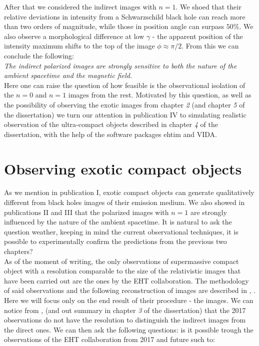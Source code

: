 \documentclass[12pt]{article}
\numberwithin{equation}{section}
\numberwithin{figure}{section}
\begin{document}
	After that we considered the indirect images with $n = 1$. We shoed that their relative deviations in intensity from a Schwarzschild black hole can reach more than two orders of magnitude, while those in position angle can surpass $50\%$. We also observe a morphological difference at low $\gamma$ - the apparent position of the intensity maximum shifts to the top of the image $\phi\approx\pi / 2$. From this we can conclude the following:\\
	
	\emph{The indirect polarized images are strongly sensitive to both the nature of the ambient spacetime and the magnetic field.}\\
	
	Here one can raise the question of how feasible is the observational isolation of the $n = 0$ and $n = 1$ images from the rest. Motivated by this question, as well as the possibility of observing the exotic images from chapter \emph{2} (and chapter \emph{5} of the dissertation) we turn our attention in publication IV to simulating realistic observation of the ultra-compact objects described in chapter \emph{4} of the dissertation, with the help of the software packages ehtim and VIDA.
	
	\section{Observing exotic compact objects}
	
	As we mention in publication I, exotic compact objects can generate qualitatively different from black holes images of their emission medium. We also showed in publications II and III that the polarized images with $n = 1$ are strongly influenced by the nature of the ambient spacetime. It is natural to ask the question weather, keeping in mind the current observational techniques, it is possible to experimentally confirm the predictions from the previous two chapters?\\
	
	As of the moment of writing, the only observations of supermassive compact object with a resolution comparable to the size of the relativistic images that have been carried out are the ones by the EHT collaboration. The methodology of said observations and the following reconstruction of images are described in \cite{EHT_M87_II}, \cite{EHT_M87_III}. Here we will focus only on the end result of their procedure - the images. We can notice from \cite{EHT_M87_I}, \cite{EHT_SGR_I} (and out summary in chapter \emph{3} of the dissertation) that the 2017 observations do not have the resolution to distinguish the indirect images from the direct ones. We can then ask the following questions: is it possible trough the observations of the EHT collaboration from 2017 and future such to:\\
	
\end{document}
